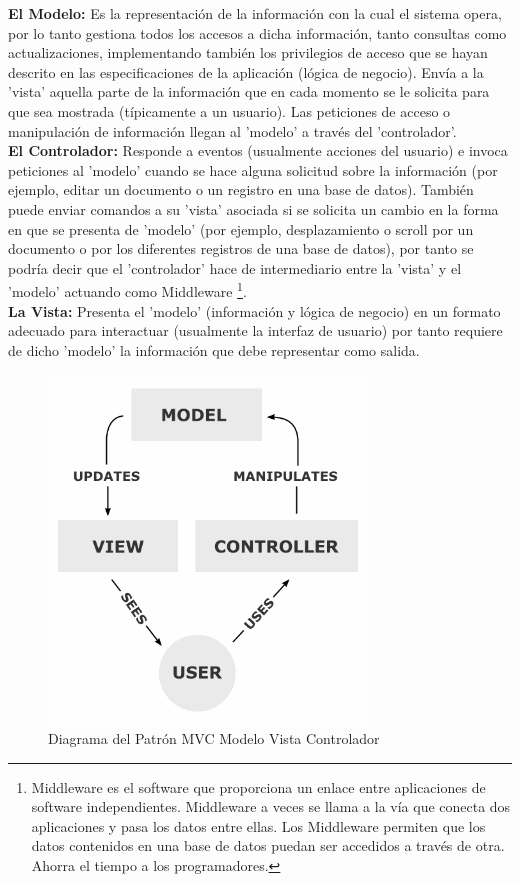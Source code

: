 {\bfseries  El Modelo:} Es la representación de la información con la cual el sistema opera, por lo tanto gestiona todos los accesos a dicha información, tanto consultas como actualizaciones, implementando también los privilegios de acceso que se hayan descrito en las especificaciones de la aplicación (lógica de negocio). Enví­a a la 'vista' aquella parte de la información que en cada momento se le solicita para que sea mostrada (tí­picamente a un usuario). Las peticiones de acceso o manipulación de información llegan al 'modelo' a través del 'controlador'. \\[0.1cm]

{\bfseries El Controlador:} Responde a eventos (usualmente acciones del usuario) e invoca peticiones al 'modelo' cuando se hace alguna solicitud sobre la información (por ejemplo, editar un documento o un registro en una base de datos). También puede enviar comandos a su 'vista' asociada si se solicita un cambio en la forma en que se presenta de 'modelo' (por ejemplo, desplazamiento  o scroll por un documento o por los diferentes registros de una base de datos),   por tanto se podrí­a decir que el 'controlador' hace de intermediario entre   la 'vista' y el 'modelo' actuando como Middleware \footnote{Middleware es el software que proporciona un enlace entre aplicaciones de software independientes. Middleware a veces se llama a la ví­a que conecta dos aplicaciones y pasa los datos entre ellas. Los Middleware permiten que los datos contenidos en una base de datos puedan ser accedidos a través de otra. Ahorra el tiempo a los programadores.}. \\[0.1cm]

{\bfseries La Vista:} Presenta el 'modelo' (información y lógica de negocio)  en un formato adecuado para interactuar (usualmente la interfaz de usuario)  por tanto requiere de dicho 'modelo' la información que debe representar como  salida.\\[0.1cm]


\begin{figure}[h]
    \centering
    \includegraphics[scale=0.7]{resourse/MVC-Process.png}
    \caption{Diagrama del Patrón MVC Modelo Vista Controlador}
    \label{fig:03}
\end{figure}    


